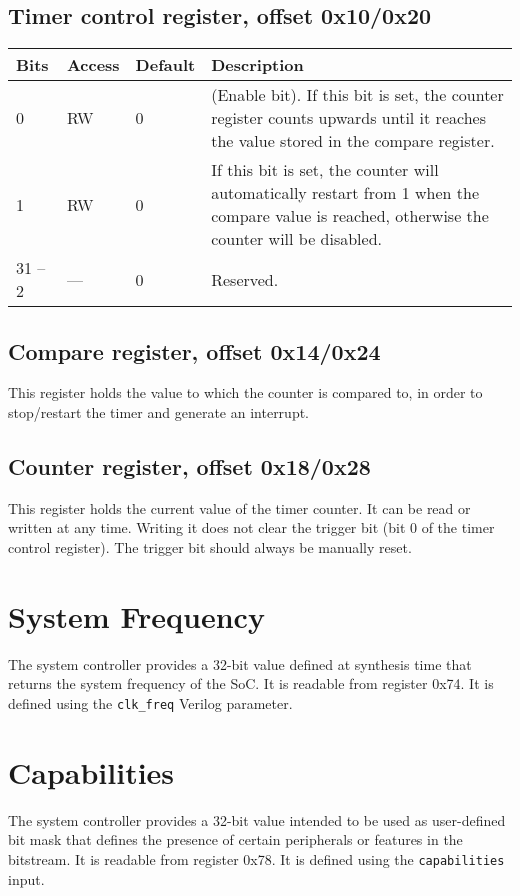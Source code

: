 \documentclass[a4paper,11pt]{article}
\begin{document}
\subsection{Timer control register, offset 0x10/0x20}
\begin{tabularx}{\textwidth}{|l|l|l|X|}
\hline
\bf Bits & \bf Access & \bf Default & \bf Description \\
\hline
0 & RW & 0 & (Enable bit). If this bit is set, the counter register counts upwards until it reaches the value stored in the compare register. \\
\hline
1 & RW & 0 & If this bit is set, the counter will automatically restart from 1 when the compare value is reached, otherwise the counter will be disabled. \\
\hline
31 -- 2 & --- & 0 & Reserved. \\
\hline
\end{tabularx}

\subsection{Compare register, offset 0x14/0x24}
This register holds the value to which the counter is compared to, in order to stop/restart the timer and generate an interrupt.

\subsection{Counter register, offset 0x18/0x28}
This register holds the current value of the timer counter. It can be read or written at any time.
Writing it does not clear the trigger bit (bit 0 of the timer control register). The trigger bit should always be manually reset.

\section{System Frequency}
The system controller provides a 32-bit value defined at synthesis time that returns the system frequency of the SoC. It is readable from register 0x74. It is defined using the \verb!clk_freq! Verilog parameter.

\section{Capabilities}
The system controller provides a 32-bit value intended to be used as user-defined bit mask that defines the presence of certain peripherals or features in the bitstream. It is readable from register 0x78. It is defined  using the \verb!capabilities! input.
\end{document}
